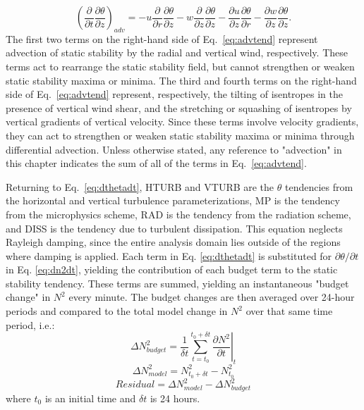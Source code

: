    \begin{equation} \label{eq:advtend}
   \left(\frac{\partial}{\partial t}\frac{\partial \theta}{\partial z}\right)_{adv} = -u\frac{\partial}{\partial r}\frac{\partial \theta}{\partial z}-w\frac{\partial}{\partial z}\frac{\partial \theta}{\partial z}-\frac{\partial u}{\partial z}\frac{\partial \theta}{\partial r}-\frac{\partial w}{\partial z}\frac{\partial \theta}{\partial z}.
   \end{equation}
The first two terms on the right-hand side of Eq.~\ref{eq:advtend} represent advection of static stability by the radial and vertical wind, respectively.
These terms act to rearrange the static stability field, but cannot strengthen or weaken static stability maxima or minima.
The third and fourth terms on the right-hand side of Eq.~\ref{eq:advtend} represent, respectively, the tilting of isentropes in the presence of vertical wind shear, and the stretching or squashing of isentropes by vertical gradients of vertical velocity.
Since these terms involve velocity gradients, they can act to strengthen or weaken static stability maxima or minima through differential advection.
Unless otherwise stated, any reference to "advection" in this chapter indicates the sum of all of the terms in Eq.~\ref{eq:advtend}.

Returning to Eq.~\ref{eq:dthetadt}, HTURB and VTURB are the $\theta$ tendencies from the horizontal and vertical turbulence parameterizations, MP is the tendency from the microphysics scheme, RAD is the tendency from the radiation scheme, and DISS is the tendency due to turbulent dissipation.
This equation neglects Rayleigh damping, since the entire analysis domain lies outside of the regions where damping is applied.
Each term in Eq. \ref{eq:dthetadt} is substituted for ${\partial \theta}/{\partial t}$ in Eq. \ref{eq:dn2dt}, yielding the contribution of each budget term to the static stability tendency.
These terms are summed, yielding an instantaneous "budget change" in $N^2$ every minute.
The budget changes are then averaged over 24-hour periods and compared to the total model change in $N^2$ over that same time period, i.e.:
   \begin{equation} \label{eq:budgetchange}
   \Delta N^2_{budget} = \frac{1}{\delta t}\sum_{t=t_0}^{t_0+\delta t} \left.\frac{\partial N^2}{\partial t}\right\vert_t
   \end{equation}
   \begin{equation} \label{eq:modelchange}
   \Delta N^2_{model} = N^2_{t_0+\delta t}-N^2_{t_0}
   \end{equation}
   \begin{equation} \label{eq:residual}
   Residual = \Delta N^2_{model}-\Delta N^2_{budget}
   \end{equation}
where $t_0$ is an initial time and $\delta t$ is 24 hours.

